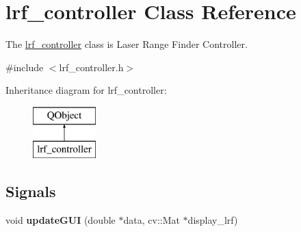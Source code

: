 \hypertarget{classlrf__controller}{}\section{lrf\+\_\+controller Class Reference}
\label{classlrf__controller}


The \hyperlink{classlrf__controller}{lrf\+\_\+controller} class is Laser Range Finder Controller.  




{\ttfamily \#include $<$lrf\+\_\+controller.\+h$>$}

Inheritance diagram for lrf\+\_\+controller\+:\begin{figure}[H]
\begin{center}
\leavevmode
\includegraphics[height=2.000000cm]{classlrf__controller}
\end{center}
\end{figure}
\subsection*{Signals}
\begin{DoxyCompactItemize}
\item 
\hypertarget{classlrf__controller_ae812bd6df2878aca8f1a07fac416992f}{}void {\bfseries update\+G\+U\+I} (double $\ast$data, cv\+::\+Mat $\ast$display\+\_\+lrf)\label{classlrf__controller_ae812bd6df2878aca8f1a07fac416992f}

\end{DoxyCompactItemize}
